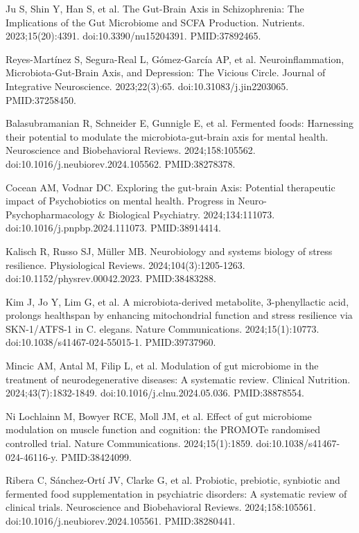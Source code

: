 \documentclass[12pt,oneside]{book}
\newcommand{\reff}[2]{\par\hangindent=7mm\hangafter=1\noindent[#1]\hspace{2mm}#2\par}
\begin{document}
\reff{24}{Ju S, Shin Y, Han S, et al. The Gut-Brain Axis in Schizophrenia: The Implications of the Gut Microbiome and SCFA Production. Nutrients. 2023;15(20):4391. doi:10.3390/nu15204391. PMID:37892465.}

\reff{25}{Reyes-Martínez S, Segura-Real L, Gómez-García AP, et al. Neuroinflammation, Microbiota-Gut-Brain Axis, and Depression: The Vicious Circle. Journal of Integrative Neuroscience. 2023;22(3):65. doi:10.31083/j.jin2203065. PMID:37258450.}

\reff{26}{Balasubramanian R, Schneider E, Gunnigle E, et al. Fermented foods: Harnessing their potential to modulate the microbiota-gut-brain axis for mental health. Neuroscience and Biobehavioral Reviews. 2024;158:105562. doi:10.1016/j.neubiorev.2024.105562. PMID:38278378.}

\reff{27}{Cocean AM, Vodnar DC. Exploring the gut-brain Axis: Potential therapeutic impact of Psychobiotics on mental health. Progress in Neuro-Psychopharmacology \& Biological Psychiatry. 2024;134:111073. doi:10.1016/j.pnpbp.2024.111073. PMID:38914414.}

\reff{28}{Kalisch R, Russo SJ, Müller MB. Neurobiology and systems biology of stress resilience. Physiological Reviews. 2024;104(3):1205-1263. doi:10.1152/physrev.00042.2023. PMID:38483288.}

\reff{29}{Kim J, Jo Y, Lim G, et al. A microbiota-derived metabolite, 3-phenyllactic acid, prolongs healthspan by enhancing mitochondrial function and stress resilience via SKN-1/ATFS-1 in C. elegans. Nature Communications. 2024;15(1):10773. doi:10.1038/s41467-024-55015-1. PMID:39737960.}

\reff{30}{Mincic AM, Antal M, Filip L, et al. Modulation of gut microbiome in the treatment of neurodegenerative diseases: A systematic review. Clinical Nutrition. 2024;43(7):1832-1849. doi:10.1016/j.clnu.2024.05.036. PMID:38878554.}

\reff{31}{Ni Lochlainn M, Bowyer RCE, Moll JM, et al. Effect of gut microbiome modulation on muscle function and cognition: the PROMOTe randomised controlled trial. Nature Communications. 2024;15(1):1859. doi:10.1038/s41467-024-46116-y. PMID:38424099.}

\reff{32}{Ribera C, Sánchez-Ortí JV, Clarke G, et al. Probiotic, prebiotic, synbiotic and fermented food supplementation in psychiatric disorders: A systematic review of clinical trials. Neuroscience and Biobehavioral Reviews. 2024;158:105561. doi:10.1016/j.neubiorev.2024.105561. PMID:38280441.}
\end{document}
